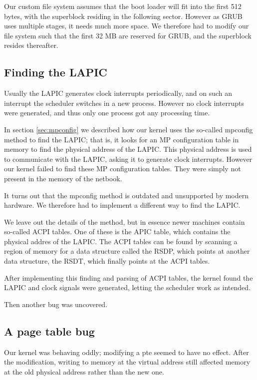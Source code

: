 \documentclass{article}
\begin{document}
Our custom file system assumes that the boot loader will fit into the first
512 bytes, with the superblock residing in the following sector. However as
GRUB uses multiple stages, it needs much more space. We therefore had to
modify our file system such that the first 32 MB are reserved for GRUB, and
the superblock resides thereafter.


\subsection{Finding the LAPIC}
Usually the LAPIC generates clock interrupts periodically, and on such an
interrupt the scheduler switches in a new process. However no clock interrupts
were generated, and thus only one process got any processing time. 

In section \ref{sec:mpconfig} we described how our kernel uses the so-called
\gls{mpconfig} method to find the LAPIC; that is, it looks for an MP
configuration table in memory to find the physical address of the LAPIC. This
physical address is used to communicate with the LAPIC, asking it to generate
clock interrupts. However our kernel failed to find these MP configuration
tables. They were simply not present in the memory of the netbook.

It turns out that the \gls{mpconfig} method is outdated and unsupported by
modern hardware. We therefore had to implement a different way to find the
LAPIC.

We leave out the details of the method, but in essence newer machines contain
so-called ACPI tables. One of these is the APIC table, which contains the
physical addres of the LAPIC. The ACPI tables can be found by scanning a
region of memory for a data structure called the RSDP, which points at another
data structure, the RSDT, which finally points at the ACPI tables.

After implementing this finding and parsing of ACPI tables, the kernel found
the LAPIC and clock signals were generated, letting the scheduler work as
intended.

Then another bug was uncovered.


\subsection{A page table bug}
Our kernel was behaving oddly; modifying a \gls{pte} seemed to have no effect.
After the modification, writing to memory at the virtual address still
affected memory at the old physical address rather than the new one.
\end{document}
